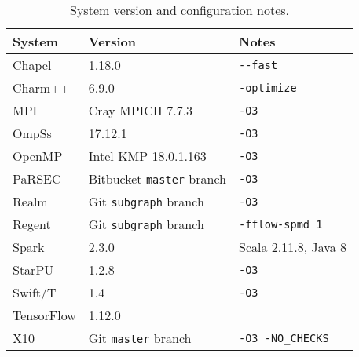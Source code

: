 \begin{table}[t]
\begin{tabular}{l | l | l}
System & Version & Notes \\
\hline
Chapel & 1.18.0 & {\lstinline!--fast!} \\
Charm++ & 6.9.0 & {\lstinline!-optimize!} \\
MPI & Cray MPICH 7.7.3 & {\lstinline!-O3!} \\
OmpSs & 17.12.1 & {\lstinline!-O3!} \\
OpenMP & Intel KMP 18.0.1.163 & {\lstinline!-O3!} \\
PaRSEC & Bitbucket {\lstinline!master!} branch & {\lstinline!-O3!} \\
Realm & Git {\lstinline!subgraph!} branch & {\lstinline!-O3!} \\
Regent & Git {\lstinline!subgraph!} branch & {\lstinline!-fflow-spmd 1!} \\
Spark & 2.3.0 & Scala 2.11.8, Java 8 \\
StarPU & 1.2.8 & {\lstinline!-O3!} \\
Swift/T & 1.4 & {\lstinline!-O3!} \\
TensorFlow & 1.12.0 & \\
X10 & Git {\lstinline!master!} branch & {\lstinline!-O3 -NO_CHECKS!}
\end{tabular}

\caption{System version and configuration notes.\label{tab:flags}}
\vspace{-0.5cm}
\end{table}
